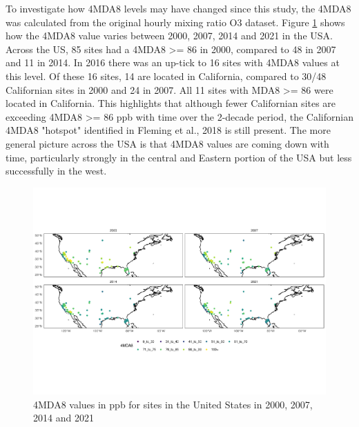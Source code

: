 \documentclass[journal abbreviation, manuscript]{copernicus}
\begin{document}
To investigate how 4MDA8 levels may have changed since this study, the 4MDA8 was calculated from the original hourly mixing ratio O3 dataset. Figure \ref{fig:us_4mda8_map} shows how the 4MDA8 value varies between 2000, 2007, 2014 and 2021 in the USA. Across the US, 85 sites had a 4MDA8 >= 86 in 2000, compared to 48 in 2007 and 11 in 2014. In 2016 there was an up-tick to 16 sites with 4MDA8 values at this level. Of these 16 sites, 14 are located in California, compared to 30/48 Californian sites in 2000 and 24 in 2007. All 11 sites with MDA8 >= 86 were located in California. This highlights that although fewer Californian sites are exceeding 4MDA8 >= 86 ppb with time over the 2-decade period, the Californian 4MDA8 "hotspot" identified in Fleming et al., 2018 is still present. The more general picture across the USA is that 4MDA8 values are coming down with time, particularly strongly in the central and Eastern portion of the USA but less successfully in the west.

\begin{figure}[h]
\includegraphics[width=12cm]{figures/f11_4mda8_us.pdf}
\caption{4MDA8 values in ppb for sites in the United States in 2000, 2007, 2014 and 2021}
\label{fig:us_4mda8_map}
\end{figure}
\end{document}
